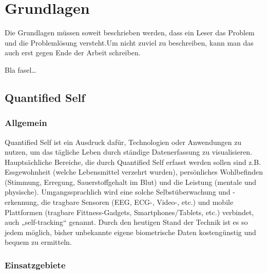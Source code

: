 
\chapter{Grundlagen}
\label{ch:Grundlagen}
Die Grundlagen müssen soweit beschrieben
werden, dass ein Leser das Problem und
die Problemlösung  versteht.Um nicht zuviel 
zu beschreiben, kann man das auch erst gegen 
Ende der Arbeit schreiben.

Bla fasel\ldots

\section{Quantified Self}
\label{ch:Grundlagen:sec:Quantified Self}

\subsection{Allgemein}
\label{ch:Grundlagen:sec:Quantified Self:subsec:Allg}

Quantified Self ist ein Ausdruck dafür, Technologien oder Anwendungen zu nutzen, um das tägliche Leben durch ständige Datenerfassung zu visualisieren.
Hauptsächliche Bereiche, die durch Quantified Self erfasst werden sollen sind z.B. Essgewohnheit (welche Lebensmittel verzehrt wurden), persönliches Wohlbefinden (Stimmung, Erregung, Sauerstoffgehalt im Blut) und die Leistung (mentale und physische). 
Umgangssprachlich wird eine solche Selbstüberwachung und -erkennung, die tragbare Sensoren (EEG, ECG-, Video-, etc.) und mobile Plattformen (tragbare Fittness-Gadgets, Smartphones/Tablets, etc.) verbindet, auch „self-tracking“ genannt. 
Durch den heutigen Stand der Technik ist es so jedem möglich, bisher unbekannte eigene biometrische Daten kostengünstig und bequem zu ermitteln.

\subsection{Einsatzgebiete}
\label{ch:Grundlagen:sec:Quantified Self:subsec:Einsatz}

